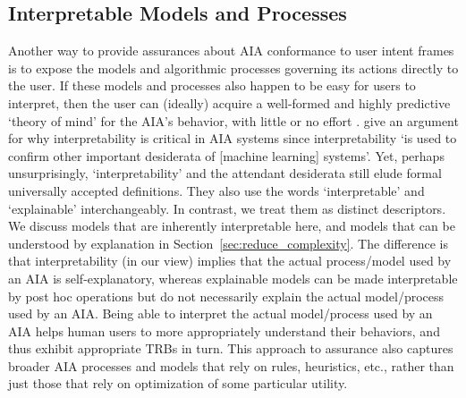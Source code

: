 \subsection{Interpretable Models and Processes} \label{sec:interp_models}
Another way to provide assurances about AIA conformance to user intent frames is to expose the models and algorithmic processes governing its actions directly to the user. If these models and processes also happen to be easy for users to interpret, then the user can (ideally) acquire a well-formed and highly predictive `theory of mind' for the AIA's behavior, with little or no effort . 
\citet{Doshi-Velez2017-xy} give an argument for why interpretability is critical in AIA systems since interpretability `is used to confirm other important desiderata of [machine learning] systems'. 
Yet, perhaps unsurprisingly, `interpretability' and the attendant desiderata still elude formal universally accepted definitions. 
They also use the words `interpretable' and `explainable' interchangeably. In contrast, we treat them as distinct descriptors. We discuss models that are inherently interpretable here, and models that can be understood by explanation in Section~\ref{sec:reduce_complexity}.  The difference is that interpretability (in our view) implies that the actual process/model used by an AIA is self-explanatory, whereas explainable models can be made interpretable by post hoc operations but do not necessarily explain the actual model/process used by an AIA. 
Being able to interpret the actual model/process used by an AIA helps human users to more appropriately understand their behaviors, and thus exhibit appropriate TRBs in turn. This approach to assurance also captures broader AIA processes and models that rely on rules, heuristics, etc., rather than just those that rely on optimization of some particular utility. 

